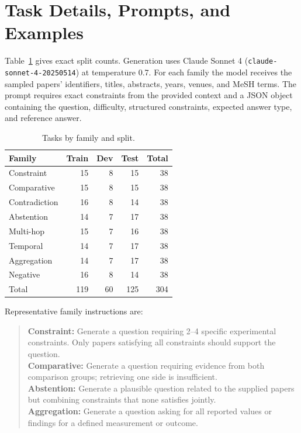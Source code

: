 \documentclass{article}
\begin{document}
\section{Task Details, Prompts, and Examples}
\label{app:taskdetails}
\label{app:generation}

Table~\ref{tab:splits} gives exact split counts. Generation uses Claude Sonnet 4 (\texttt{claude-sonnet-4-20250514}) at temperature 0.7. For each family the model receives the sampled papers' identifiers, titles, abstracts, years, venues, and MeSH terms. The prompt requires exact constraints from the provided context and a JSON object containing the question, difficulty, structured constraints, expected answer type, and reference answer.

\begin{table}[h]
\centering
\caption{Tasks by family and split.}
\label{tab:splits}
\small
\begin{tabular}{lrrrr}
\toprule
Family & Train & Dev & Test & Total \\
\midrule
Constraint & 15 & 8 & 15 & 38 \\
Comparative & 15 & 8 & 15 & 38 \\
Contradiction & 16 & 8 & 14 & 38 \\
Abstention & 14 & 7 & 17 & 38 \\
Multi-hop & 15 & 7 & 16 & 38 \\
Temporal & 14 & 7 & 17 & 38 \\
Aggregation & 14 & 7 & 17 & 38 \\
Negative & 16 & 8 & 14 & 38 \\
\midrule
Total & 119 & 60 & 125 & 304 \\
\bottomrule
\end{tabular}
\end{table}

Representative family instructions are:
\begin{quote}\small
\textbf{Constraint:} Generate a question requiring 2--4 specific experimental constraints. Only papers satisfying all constraints should support the question.\\
\textbf{Comparative:} Generate a question requiring evidence from both comparison groups; retrieving one side is insufficient.\\
\textbf{Abstention:} Generate a plausible question related to the supplied papers but combining constraints that none satisfies jointly.\\
\textbf{Aggregation:} Generate a question asking for all reported values or findings for a defined measurement or outcome.
\end{quote}
\end{document}
